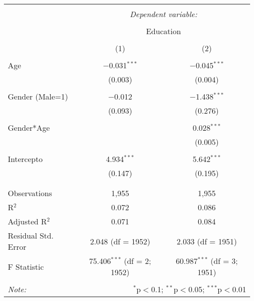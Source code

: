 
\begin{table}[!htbp] \centering 
  \caption{} 
  \label{} 
\begin{tabular}{@{\extracolsep{5pt}}lcc} 
\\[-1.8ex]\hline 
\hline \\[-1.8ex] 
 & \multicolumn{2}{c}{\textit{Dependent variable:}} \\ 
\cline{2-3} 
\\[-1.8ex] & \multicolumn{2}{c}{Education} \\ 
\\[-1.8ex] & (1) & (2)\\ 
\hline \\[-1.8ex] 
 Age & $-$0.031$^{***}$ & $-$0.045$^{***}$ \\ 
  & (0.003) & (0.004) \\ 
  & & \\ 
 Gender (Male=1) & $-$0.012 & $-$1.438$^{***}$ \\ 
  & (0.093) & (0.276) \\ 
  & & \\ 
 Gender*Age &  & 0.028$^{***}$ \\ 
  &  & (0.005) \\ 
  & & \\ 
 Intercepto & 4.934$^{***}$ & 5.642$^{***}$ \\ 
  & (0.147) & (0.195) \\ 
  & & \\ 
\hline \\[-1.8ex] 
Observations & 1,955 & 1,955 \\ 
R$^{2}$ & 0.072 & 0.086 \\ 
Adjusted R$^{2}$ & 0.071 & 0.084 \\ 
Residual Std. Error & 2.048 (df = 1952) & 2.033 (df = 1951) \\ 
F Statistic & 75.406$^{***}$ (df = 2; 1952) & 60.987$^{***}$ (df = 3; 1951) \\ 
\hline 
\hline \\[-1.8ex] 
\textit{Note:}  & \multicolumn{2}{r}{$^{*}$p$<$0.1; $^{**}$p$<$0.05; $^{***}$p$<$0.01} \\ 
\end{tabular} 
\end{table} 
